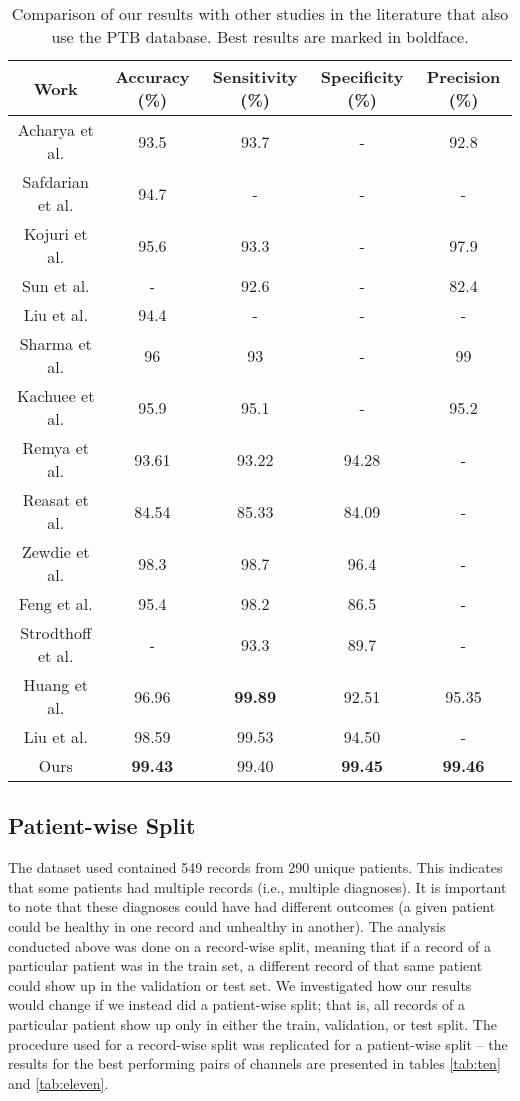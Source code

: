\documentclass{svproc}
\begin{document}
\renewcommand{\arraystretch}{1.3}
\begin{table}[hbt!]
\centering
\caption{Comparison of our results with other studies in the literature that also use the PTB database. Best results are marked in boldface.}
\begin{tabular}{c|c|c|c|c}
 \textbf{Work} & \textbf{Accuracy (\%)} & \textbf{Sensitivity (\%)} & \textbf{Specificity (\%)} & \textbf{Precision (\%)} \\ \hline
 Acharya et al. & 93.5 & 93.7 & - & 92.8 \\ 
 Safdarian et al. & 94.7 & - & - & - \\ 
 Kojuri et al. & 95.6 & 93.3 & - & 97.9 \\ 
 Sun et al. & - & 92.6 & - & 82.4 \\ 
 Liu et al. & 94.4 & - & - & - \\ 
 Sharma et al. & 96 & 93 & - & 99 \\ 
 Kachuee et al. & 95.9 & 95.1 & - & 95.2 \\ 
 Remya et al. & 93.61 & 93.22 & 94.28 & - \\
 Reasat et al. & 84.54 & 85.33 & 84.09 & - \\
 Zewdie et al. & 98.3 & 98.7 & 96.4 & - \\
 Feng et al. & 95.4 & 98.2 & 86.5 & - \\
 Strodthoff et al. & - & 93.3 & 89.7 & - \\
 Huang et al. & 96.96 & \textbf{99.89} & 92.51 & 95.35 \\
 Liu et al. & 98.59 & 99.53 & 94.50 & - \\
 Ours & \textbf{99.43} & 99.40 & \textbf{99.45} & \textbf{99.46}
 \label{tab:nine}
 \end{tabular}
\end{table}


\subsection{Patient-wise Split}

The dataset used contained 549 records from 290 unique patients. This indicates that some patients had multiple records (i.e., multiple diagnoses). It is important to note that these diagnoses could have had different outcomes (a given patient could be healthy in one record and unhealthy in another). The analysis conducted above was done on a record-wise split, meaning that if a record of a particular patient was in the train set, a different record of that same patient could show up in the validation or test set. We investigated how our results would change if we instead did a patient-wise split; that is, all records of a particular patient show up only in either the train, validation, or test split. The procedure used for a record-wise split was replicated for a patient-wise split -- the results for the best performing pairs of channels are presented in tables \ref{tab:ten} and \ref{tab:eleven}.
\end{document}

